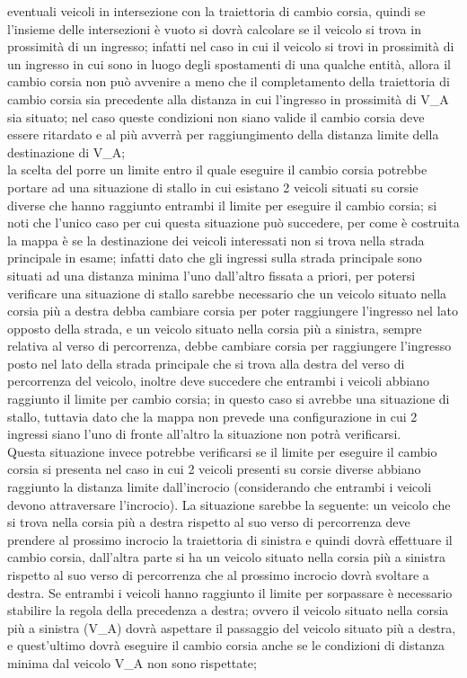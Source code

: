 \begin{enumerate}
\begin{enumerate}
eventuali veicoli in intersezione con la traiettoria di cambio corsia, quindi se l'insieme delle intersezioni è vuoto si dovrà calcolare se il veicolo si trova in prossimità di un ingresso; infatti nel caso in cui il veicolo si trovi in prossimità di un ingresso in cui sono in luogo degli spostamenti di una qualche entità, allora il cambio corsia non può avvenire a meno che il completamento della traiettoria di cambio corsia sia precedente alla distanza in cui l'ingresso in prossimità di V\_A sia situato; nel caso queste condizioni non siano valide il cambio corsia deve essere ritardato e al più avverrà per raggiungimento della distanza limite della destinazione di V\_A;\\
la scelta del porre un limite entro il quale eseguire il cambio corsia potrebbe portare ad una situazione di stallo in cui esistano 2 veicoli situati su corsie diverse che hanno raggiunto entrambi il limite per eseguire il cambio corsia; si noti che l'unico caso per cui questa situazione può succedere, per come è costruita la mappa è se la destinazione dei veicoli interessati non si trova nella strada principale in esame; infatti dato che gli ingressi sulla strada principale sono situati ad una distanza minima l'uno dall'altro fissata a priori, per potersi verificare una situazione di stallo sarebbe necessario che un veicolo situato nella corsia più a destra debba cambiare corsia per poter raggiungere l'ingresso nel lato opposto della strada, e un veicolo situato nella corsia più a sinistra, sempre relativa al verso di percorrenza, debbe cambiare corsia per raggiungere l'ingresso posto nel lato della strada principale che si trova alla destra del verso di percorrenza del veicolo, inoltre deve succedere che entrambi i veicoli abbiano raggiunto il limite per cambio corsia; in questo caso si avrebbe una situazione di stallo, tuttavia dato che la mappa non prevede una configurazione in cui 2 ingressi siano l'uno di fronte all'altro la situazione non potrà verificarsi. \\
Questa situazione invece potrebbe verificarsi se il limite per eseguire il cambio corsia si presenta nel caso in cui 2 veicoli presenti su corsie diverse abbiano raggiunto la distanza limite dall'incrocio (considerando che entrambi i veicoli devono attraversare l'incrocio). La situazione sarebbe la seguente: un veicolo che si trova nella corsia più a destra rispetto al suo verso di percorrenza deve prendere al prossimo incrocio la traiettoria di sinistra e quindi dovrà effettuare il cambio corsia, dall'altra parte si ha un veicolo situato nella corsia più a sinistra rispetto al suo verso di percorrenza che al prossimo incrocio dovrà svoltare a destra. Se entrambi i veicoli hanno raggiunto il limite per sorpassare è necessario stabilire la regola della precedenza a destra; ovvero il veicolo situato nella corsia più a sinistra (V\_A) dovrà aspettare il passaggio del veicolo situato più a destra, e quest'ultimo dovrà eseguire il cambio corsia anche se le condizioni di distanza minima dal veicolo V\_A non sono rispettate;

\end{enumerate}
\end{enumerate}
